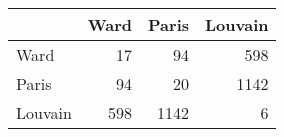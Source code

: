 \begin{tabular}{lrrr}
\toprule
{} &  Ward &  Paris &  Louvain \\
\midrule
Ward    &    17 &     94 &      598 \\
Paris   &    94 &     20 &     1142 \\
Louvain &   598 &   1142 &        6 \\
\bottomrule
\end{tabular}
